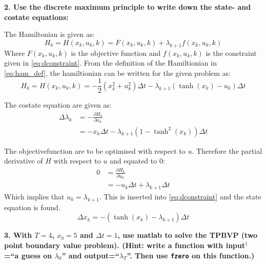 \textbf{2. Use the discrete maximum principle to write down the state- and costate equations:}

The Hamiltonian is given as:
\begin{equation}
  H_k = H\left( x_k, u_k, k \right) = F\left( x_k, u_k, k \right) + \lambda_{k + 1} f\left( x_k, u_k, k \right)
  \label{eq:ham_def}
\end{equation}
Where $F\left( x_k, u_k, k \right)$ is the objective function and $f\left( x_k, u_k, k \right)$ is the constraint given
in \eqref{eq:dconstraint}.
From the definition of the Hamiltionian in \eqref{eq:ham_def}, the hamiltionian can be written for the given problem as:
\begin{equation} 
  H_k = H\left( x_k, u_k, k \right) = - \frac{1}{2}\left( x_k^2 + u_k^2 \right)\Delta t - \lambda_{k + 1}
  \left( \tanh{(x_k) - u_k} \right)\Delta t
\end{equation}

The costate equation are given as:
\begin{equation}
  \begin{split}
    \Delta\lambda_k &= - \frac{\partial H_k}{\partial x_k} \\
    &= - x_k \Delta t - \lambda_{k + 1} \left( 1 - \tanh^2{(x_k)} \right)\Delta t
  \end{split}
\end{equation}

The objectivefunction are to be optimised with respect to $u$. Therefore the partial derivative of $H$ with respect to
$u$ and equated to $0$:
\begin{equation}
  \begin{split}
    0 &= \frac{\partial H_k}{\partial u_k} \\
    &= - u_k\Delta t + \lambda_{k + 1} \Delta t
  \end{split}
\end{equation}
Which implies that $u_k = \lambda_{k + 1}$. This is inserted into \eqref{eq:dconstraint} and the state equation is
found.
\begin{equation}
  \Delta x_k = -\left( \tanh{(x_k)} - \lambda_{k + 1} \right)\Delta t
\end{equation}

\textbf{3. With $T = 4$, $x_0 = 5$ and $\Delta t = 1$, use matlab to solve the TPBVP (two point boundary value
  problem). (Hint: write a function with input$^1$ =``a guess on $\lambda_0$'' and output=``$\lambda_T$''. Then use
  \texttt{fzero} on this function.)}

